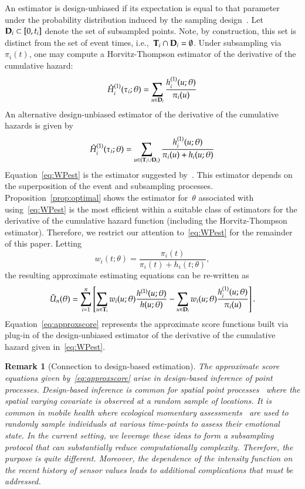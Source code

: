 \documentclass[11pt]{amsart}
\newtheorem{rmk}[thm]{Remark}%
\def\bfT{{\bf T}}
\def\bfD{{\bf D}}
\begin{document}
An estimator is design-unbiased if its expectation is equal to that parameter under the probability distribution induced by the sampling design~\citep{Cassel1977}. Let~$\bfD_i \subset [0,t_i]$ denote the set of subsampled points.  Note, by construction, this set is distinct from the set of event times, i.e.,~$\bfT_i \cap \bfD_i = \emptyset$.  Under subsampling via $\pi_i (t)$, one may compute a Horvitz-Thompson estimator of the derivative of the cumulative hazard:
\[
\hat H_{i}^{(1)} (\tau_i; \theta) = \sum_{u \in \bfD_i} \frac{
  h^{(1)}_i (u; \theta) }{ \pi_i (u) }
\]
An alternative design-unbiased estimator of the derivative of the cumulative hazards is given by
\begin{equation}
\label{eq:WPest}
\hat H_{i}^{(1)} (\tau_i; \theta) = \sum_{u \in (\bfT_i \cup \bfD_i)}
\frac{ h^{(1)}_i ( u; \theta ) }{ \pi_i (u) + h_i ( u ; \theta) }
\end{equation}
Equation~\eqref{eq:WPest} is the estimator suggested by~\cite{Waagepetersen2008}.  This estimator depends on the superposition of the event and subsampling processes. Proposition~\ref{prop:optimal} shows the estimator for~$\theta$ associated with using~\eqref{eq:WPest} is the most efficient within a suitable class of estimators for the derivative of the cumulative hazard function (including the Horvitz-Thompson estimator). Therefore, we restrict our attention to~\eqref{eq:WPest} for the remainder of this paper. Letting
\begin{equation}
\label{eq:waage_weights}
w_i (t; \theta) = \frac{\pi_i (t)}{\pi_i (t) + h_i (t ; \theta)},
\end{equation}
the resulting approximate estimating equations can be re-written as
\begin{equation}
\label{eq:approxscore}
\hat{U}_n (\theta) = \sum_{i=1}^n \left[ \sum_{u \in \bfT_i} w_i(u; \theta)
  \frac{h^{(1)} (u; \theta)}{ h ( u; \theta)}  - \sum_{u \in \bfD_i} w_i(u;
  \theta) \frac{h_i^{(1)} (u; \theta)}{ \pi_i (u) } \right].
\end{equation}
Equation~\eqref{eq:approxscore} represents the approximate score functions built via plug-in of the design-unbiased estimator of the derivative of the cumulative hazard given in~\eqref{eq:WPest}.

\begin{rmk}[Connection to design-based estimation]
The approximate score equations given by~\eqref{eq:approxscore} arise in design-based inference of point processes.  Design-based inference is common for spatial point processes~\citep{Waagepetersen2008} where the spatial varying covariate is observed at a random sample of locations. It is common in mobile health where ecological momentary assessments~\citep{Rathbun2012,Rathbun2016} are used to randomly sample individuals at various time-points to assess their emotional state.  In the current setting, we leverage these ideas to form a subsampling protocol that can substantially reduce computationally complexity.  Therefore, the purpose is quite different. Moreover, the dependence of the intensity function on the recent history of sensor values leads to additional complications that must be addressed.
\end{rmk}
\end{document}
